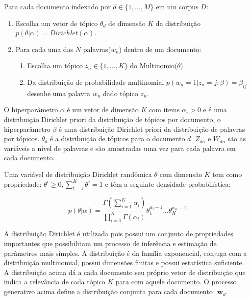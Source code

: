 \documentclass[12pt,a4paper]{article}
\begin{document}
  Para cada documento indexado por $d \in \{1,. . . , M\}$ em um corpus $D$:
  
  \begin{enumerate}
    \item Escolha um vetor de tópico $\theta _d$ de dimensão $K$ da distribuição $p(\theta|\alpha)=Dirichlet(\alpha)$.
    \item Para cada uma das $N$ palavras($w_n$) dentro de um documento:
    \begin{enumerate}
      \item Escolha um tópico \(z_n \in \{1,. . . , K\}\) do Multinomio($\theta$).
      \item Da distribuição de probabilidade multinomial \(p(w_n=1| z_n=j,\beta)=\beta _{ij}\)  desenhe uma palavra $w_n$ dado tópico $z_n$.
    \end{enumerate}
  \end{enumerate}
  
  O  hiperparâmetro $\alpha$ é um vetor de dimensão $K$ com items \(\alpha _i>0\) e é uma distribuição Dirichlet priori da distribuição de tópicos por documento, o hiperparâmetro $\beta$ é uma distribuição Dirichlet priori da distribuição de palavras por tópicos. $\theta _d$ é a distribuição de tópicos para o documento $d$. $Z_{dn}$ e $W_{dn}$ são as variáveis a nível de palavras e são amostradas uma vez para cada palavra em cada documento.
  
  Uma variável de distribuição Dirichlet randômica $\theta$ com dimensão $K$ tem como propriedade: $\theta ^i \geq 0, \displaystyle\sum_{i=1}^{K} \theta ^i = 1$ e têm a seguinte densidade probabilística:
  
  \begin{equation}
  p(\theta|\alpha) = \frac{\Gamma(\displaystyle\sum_{i=1}^{K} \alpha _i)}{\displaystyle\prod_{i=1}^{K} \Gamma(\alpha _i)} \theta _1 ^{\alpha _i - 1} ...  \theta _K ^{\alpha _K - 1}
  \end{equation}
  
  A distribuição Dirichlet é utilizada pois possui um conjunto de propriedades importantes que possibilitam um processo de inferência e estimação de parâmetros mais simples. A distribuição é da família exponencial, conjuga com a distribuição multinomial, possui dimensões finitas e possui estatística suficiente. A distribuição  acima dá a cada documento seu próprio vetor de distribuição que indica a relevância de cada tópico $K$ para com aquele documento. O processo generativo acima define a distribuição conjunta para cada documento $\textbf{ w}_d$.
  
\end{document}
